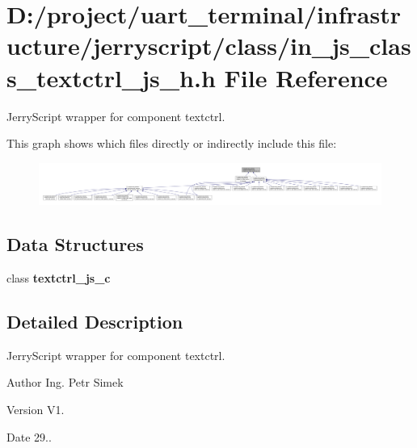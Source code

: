 \section{D\+:/project/uart\+\_\+terminal/infrastructure/jerryscript/class/in\+\_\+js\+\_\+class\+\_\+textctrl\+\_\+js\+\_\+h.h File Reference}
\label{in__js__class__textctrl__js__h_8h}


Jerry\+Script wrapper for component textctrl.  


This graph shows which files directly or indirectly include this file\+:
\nopagebreak
\begin{figure}[H]
\begin{center}
\leavevmode
\includegraphics[width=350pt]{in__js__class__textctrl__js__h_8h__dep__incl}
\end{center}
\end{figure}
\subsection*{Data Structures}
\begin{DoxyCompactItemize}
\item 
class \textbf{ textctrl\+\_\+js\+\_\+c}
\end{DoxyCompactItemize}


\subsection{Detailed Description}
Jerry\+Script wrapper for component textctrl. 

\begin{DoxyAuthor}{Author}
Ing. Petr Simek 
\end{DoxyAuthor}
\begin{DoxyVersion}{Version}
V1. 
\end{DoxyVersion}
\begin{DoxyDate}{Date}
29.. 
\end{DoxyDate}
